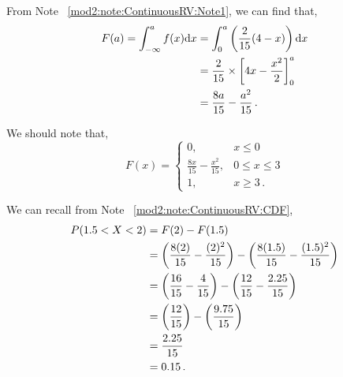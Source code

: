 \begin{subquestions}
\begin{subsubquestions}
\subsubquestion

From Note ~\ref{mod2:note:ContinuousRV:Note1}, we can find that,
\begin{align}
	F(a) = \int_{-\infty}^{a} f(x)\mathrm{d}x & = \int_{0}^{a}\left( \frac{2}{15}(4-x)\right)\mathrm{d}x \nonumber \\
	                                  & = \frac{2}{15} \times \left[4x - \frac{x^2}{2} \right]^a_0 \nonumber \\
	                                  & = \frac{8a}{15} - \frac{a^2}{15} \,.
\end{align}

We should note that,
\[ F(x) =
\begin{cases} 
	0, & x \leq 0 \\
	\frac{8x}{15} - \frac{x^2}{15}, & 0 \leq x \leq 3 \\
	1, & x \geq 3 \,.
\end{cases}
\]


\subsubquestion

We can recall from Note ~\ref{mod2:note:ContinuousRV:CDF}, 
\begin{align}
		P( 1.5 < X < 2) & = F(2) - F(1.5) \nonumber \\
		                & = \left(\frac{8(2)}{15} - \frac{(2)^2}{15}\right) - \left(\frac{8(1.5)}{15} - \frac{(1.5)^2}{15}\right) \nonumber \\
		                & = \left(\frac{16}{15} - \frac{4}{15}\right) - \left(\frac{12}{15} - \frac{2.25}{15}\right) \nonumber \\
		                & = \left(\frac{12}{15}\right) - \left(\frac{9.75}{15} \right) \nonumber \\
		                & = \frac{2.25}{15} \nonumber \\
		                & = 0.15 \,.
\end{align}

\end{subsubquestions}
	
	
\end{subquestions}

